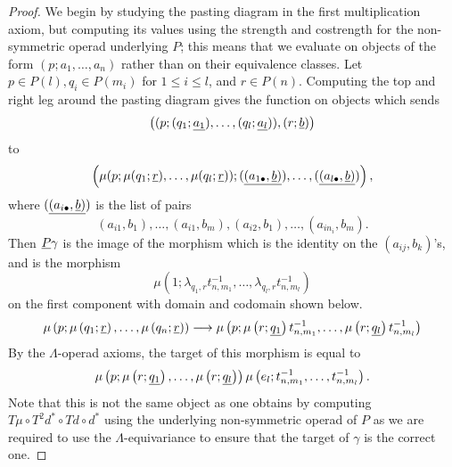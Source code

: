 \begin{proof}
We begin by studying the pasting diagram in the first multiplication axiom, but computing its values using the strength and costrength for the non-symmetric operad underlying $P$; this means that we evaluate on objects of the form $(p; a_{1}, \ldots, a_{n})$ rather than on their equivalence classes. Let $p \in P(l), q_{i} \in P(m_{i})$ for $1 \leq i \leq l$, and $r \in P(n)$. Computing the top and right leg around the pasting diagram gives the function on objects which sends
  \[
    \left( (p; (q_{1}; \underline{a_{1}}), \ldots, (q_{l}; \underline{a_{l}})), (r; \underline{b}) \right)
  \]
to
  \[
    \left( \mu(p; \mu(q_{1}; \underline{r}), \ldots, \mu(q_{l}; \underline{r})); (\underline{(a_{1\bullet}, \underline{b})}), \ldots, (\underline{(a_{l\bullet}, \underline{b})}) \right),
  \]
where $(\underline{(a_{i\bullet}, \underline{b})})$ is the list of pairs
  \[
    (a_{i1}, b_{1}), \ldots, (a_{i1}, b_{m}), (a_{i2}, b_{1}), \ldots, (a_{in_{i}}, b_{m}).
  \]
Then $\underline{P}\gamma$ is the image of the morphism which is the identity on the $(a_{ij}, b_{k})$'s, and is the morphism
  \[
    \mu\left(1;\lambda_{q_1,r}t^{-1}_{n,m_1},\ldots,\lambda_{q_l,r}t^{-1}_{n,m_l}\right)
  \]
on the first component with domain and codomain shown below.
  \[
    \mu\left(p;\mu\left(q_1;\underline{r}\right),\ldots,\mu\left(q_n;\underline{r}\right)\right) \longrightarrow \mu\left(p;\mu\left(r;\underline{q_1}\right)t^{-1}_{n,m_1},\ldots,\mu\left(r;\underline{q_l}\right)t^{-1}_{n,m_l}\right)
  \]
By the $\Lambda$-operad axioms, the target of this morphism is equal to
  \[
    \mu\left(p; \mu\left(r; \underline{q_{1}}\right), \ldots, \mu\left(r; \underline{q_{l}}\right) \right)\mu\left(e_{l}; t^{-1}_{n,m_{1}}, \ldots, t^{-1}_{n,m_{l}}\right).
  \]
Note that this is not the same object as one obtains by computing $T\mu \circ T^{2}d^{*} \circ Td \circ d^{*}$ using the underlying non-symmetric operad of $P$ as we are required to use the $\Lambda$-equivariance to ensure that the target of $\gamma$ is the correct one.


\end{proof}
